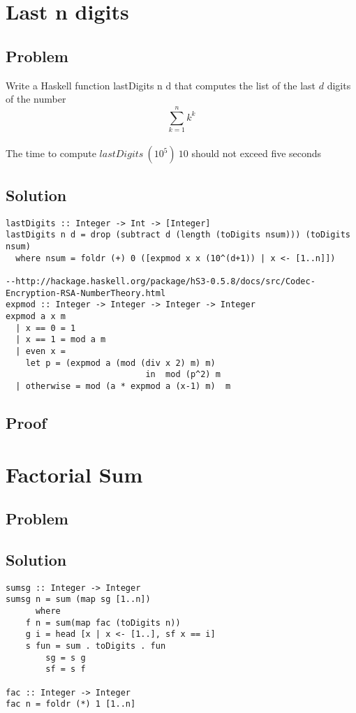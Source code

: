 \documentclass[a4paper,11pt]{article}
\begin{document}
\section{Last n digits}
\subsection{Problem}
Write a Haskell function lastDigits n d that computes the list of the last $d$ digits of the number
\begin{equation}
\sum\limits_{k=1}^n k^k
\end{equation}
\\
The time to compute $lastDigits\: (10^5)\: 10$ should not exceed five seconds

\subsection{Solution}

\begin{lstlisting}
lastDigits :: Integer -> Int -> [Integer]
lastDigits n d = drop (subtract d (length (toDigits nsum))) (toDigits nsum)
  where nsum = foldr (+) 0 ([expmod x x (10^(d+1)) | x <- [1..n]])

--http://hackage.haskell.org/package/hS3-0.5.8/docs/src/Codec-Encryption-RSA-NumberTheory.html
expmod :: Integer -> Integer -> Integer -> Integer
expmod a x m
  | x == 0 = 1
  | x == 1 = mod a m
  | even x =
    let p = (expmod a (mod (div x 2) m) m)
                            in  mod (p^2) m
  | otherwise = mod (a * expmod a (x-1) m)  m 
\end{lstlisting}

\subsection{Proof}

\section{Factorial Sum}
\subsection{Problem}

\subsection{Solution}

\begin{lstlisting}
sumsg :: Integer -> Integer
sumsg n = sum (map sg [1..n])
      where
	f n = sum(map fac (toDigits n))
	g i = head [x | x <- [1..], sf x == i]
	s fun = sum . toDigits . fun
      	sg = s g
      	sf = s f

fac :: Integer -> Integer
fac n = foldr (*) 1 [1..n]
\end{lstlisting}
\end{document}
